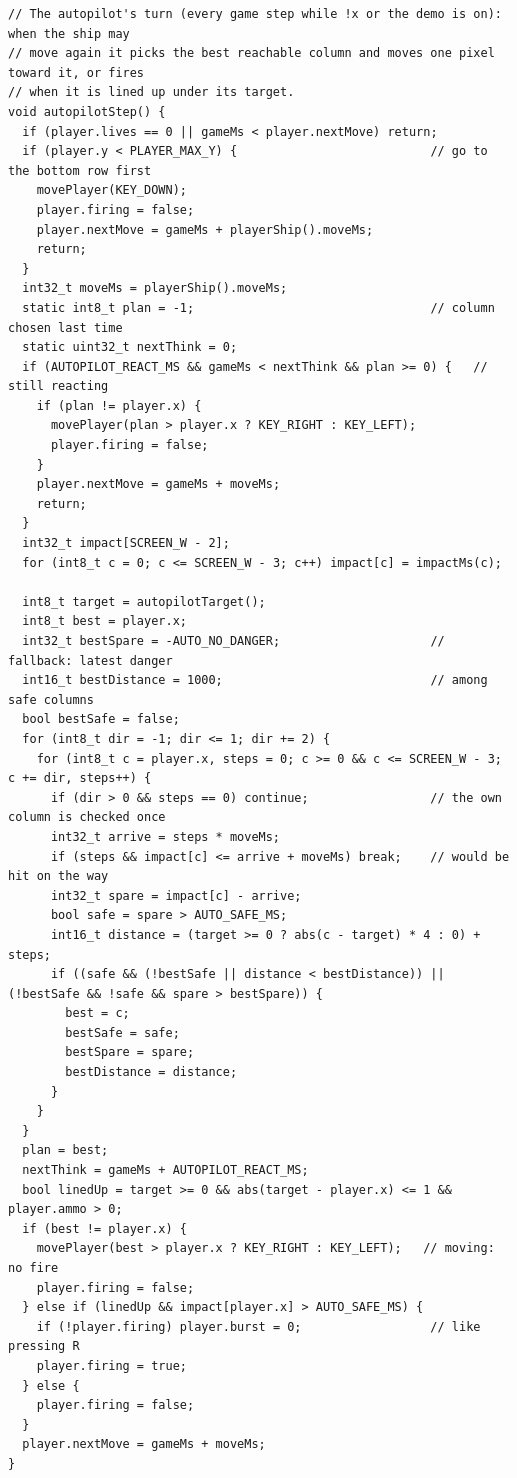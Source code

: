 \documentclass[11pt,a4paper]{article}
\begin{document}
\begin{lstlisting}[language=Arduino]
// The autopilot's turn (every game step while !x or the demo is on): when the ship may
// move again it picks the best reachable column and moves one pixel toward it, or fires
// when it is lined up under its target.
void autopilotStep() {
  if (player.lives == 0 || gameMs < player.nextMove) return;
  if (player.y < PLAYER_MAX_Y) {                           // go to the bottom row first
    movePlayer(KEY_DOWN);
    player.firing = false;
    player.nextMove = gameMs + playerShip().moveMs;
    return;
  }
  int32_t moveMs = playerShip().moveMs;
  static int8_t plan = -1;                                 // column chosen last time
  static uint32_t nextThink = 0;
  if (AUTOPILOT_REACT_MS && gameMs < nextThink && plan >= 0) {   // still reacting
    if (plan != player.x) {
      movePlayer(plan > player.x ? KEY_RIGHT : KEY_LEFT);
      player.firing = false;
    }
    player.nextMove = gameMs + moveMs;
    return;
  }
  int32_t impact[SCREEN_W - 2];
  for (int8_t c = 0; c <= SCREEN_W - 3; c++) impact[c] = impactMs(c);

  int8_t target = autopilotTarget();
  int8_t best = player.x;
  int32_t bestSpare = -AUTO_NO_DANGER;                     // fallback: latest danger
  int16_t bestDistance = 1000;                             // among safe columns
  bool bestSafe = false;
  for (int8_t dir = -1; dir <= 1; dir += 2) {
    for (int8_t c = player.x, steps = 0; c >= 0 && c <= SCREEN_W - 3; c += dir, steps++) {
      if (dir > 0 && steps == 0) continue;                 // the own column is checked once
      int32_t arrive = steps * moveMs;
      if (steps && impact[c] <= arrive + moveMs) break;    // would be hit on the way
      int32_t spare = impact[c] - arrive;
      bool safe = spare > AUTO_SAFE_MS;
      int16_t distance = (target >= 0 ? abs(c - target) * 4 : 0) + steps;
      if ((safe && (!bestSafe || distance < bestDistance)) || (!bestSafe && !safe && spare > bestSpare)) {
        best = c;
        bestSafe = safe;
        bestSpare = spare;
        bestDistance = distance;
      }
    }
  }
  plan = best;
  nextThink = gameMs + AUTOPILOT_REACT_MS;
  bool linedUp = target >= 0 && abs(target - player.x) <= 1 && player.ammo > 0;
  if (best != player.x) {
    movePlayer(best > player.x ? KEY_RIGHT : KEY_LEFT);   // moving: no fire
    player.firing = false;
  } else if (linedUp && impact[player.x] > AUTO_SAFE_MS) {
    if (!player.firing) player.burst = 0;                  // like pressing R
    player.firing = true;
  } else {
    player.firing = false;
  }
  player.nextMove = gameMs + moveMs;
}
\end{lstlisting}
\end{document}
